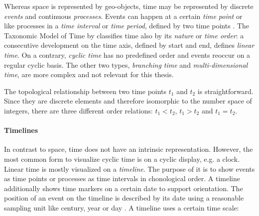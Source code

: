 \label{par:types_of_time}

Whereas space is represented by geo-objects, time may be represented by discrete \emph{events} and continuous \emph{processes}. Events can happen at a certain \emph{time point} or like processes in a \emph{time interval} or \emph{time period}, defined by two time points
\cite[chapter 2, pp. 47-49]{solana2014spatio}.
The Taxonomic Model of Time by
\cite{frank98typesoftime}
classifies time also by its \emph{nature} or \emph{time order}: a consecutive development on the time axis, defined by start and end, defines \emph{linear time}. On a contrary, \emph{cyclic time} has no predefined order and events reoccur on a regular cyclic basis. The other two types, \emph{branching time} and \emph{multi-dimensional time}, are more complex and not relevant for this thesis.

The topological relationship between two time points $t_1$ and $t_2$ is straightforward. Since they are discrete elements and therefore isomorphic to the number space of integers, there are three different order relations: $t_1 < t_2$, $t_1 > t_2$ and $t_1 = t_2$.


\paragraph{Timelines} %
\label{sub:timelines}

In contrast to space, time does not have an intrinsic representation. However, the most common form to visualize cyclic time is on a cyclic display, e.g. a  clock. Linear time is mostly visualized on a \emph{timeline}. The purpose of it is to show events as time points or processes as time intervals in chonological order. A timeline additionally shows time markers on a certain date to support orientation. The position of an event on the timeline is described by its date using a reasonable sampling unit like century, year or day
\cite[p. 32]{Langran1989timeingis}.
A timeline uses a certain time scale:


